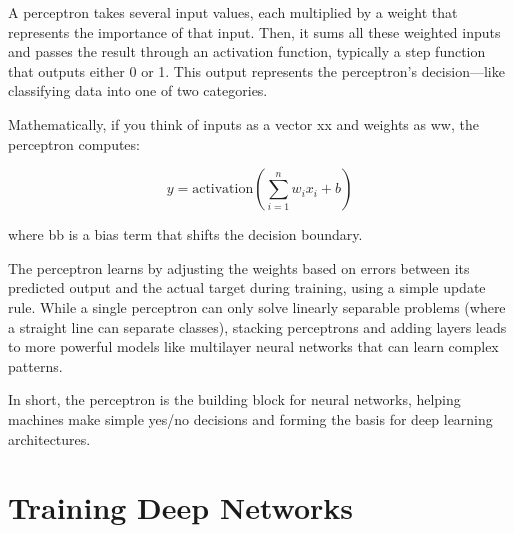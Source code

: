 \documentclass{book}
\begin{document}
A perceptron takes several input values, each multiplied by a weight that represents the importance of that input. Then, it sums all these weighted inputs and passes the result through an activation function, typically a step function that outputs either 0 or 1. This output represents the perceptron’s decision—like classifying data into one of two categories.

Mathematically, if you think of inputs as a vector xx and weights as ww, the perceptron computes:

$$ y = \text{activation}\left(\sum_{i=1}^n w_i x_i + b \right) $$

where bb is a bias term that shifts the decision boundary.

The perceptron learns by adjusting the weights based on errors between its predicted output and the actual target during training, using a simple update rule. While a single perceptron can only solve linearly separable problems (where a straight line can separate classes), stacking perceptrons and adding layers leads to more powerful models like multilayer neural networks that can learn complex patterns.

In short, the perceptron is the building block for neural networks, helping machines make simple yes/no decisions and forming the basis for deep learning architectures.

\section{Training Deep Networks}
\end{document}
